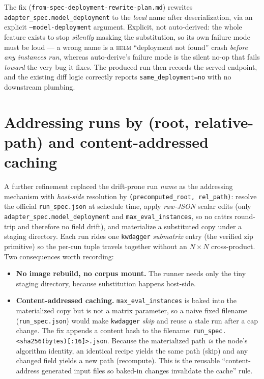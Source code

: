 \documentclass[11pt]{report}
\newcommand{\code}[1]{\texttt{#1}}
\newcommand{\file}[1]{\texttt{#1}}
\begin{document}
The fix (\file{from-spec-deployment-rewrite-plan.md}) rewrites
\code{adapter\_spec.model\_deployment} to the \emph{local} name after
deserialization, via an explicit \code{--model-deployment} argument. Explicit,
not auto-derived: the whole feature exists to stop \emph{silently} masking the
substitution, so its own failure mode must be loud --- a wrong name is a
\textsc{helm} ``deployment not found'' crash \emph{before any instances run},
whereas auto-derive's failure mode is the silent no-op that fails \emph{toward} the
very bug it fixes. The produced run then records the served endpoint, and the
existing diff logic correctly reports \code{same\_deployment=no} with no downstream
plumbing.

\section{Addressing runs by (root, relative-path) and content-addressed caching}

A further refinement replaced the drift-prone run \emph{name} as the addressing
mechanism with \emph{host-side} resolution by \code{(precomputed\_root,
rel\_path)}: resolve the official \file{run\_spec.json} at schedule time, apply
\emph{raw-JSON} scalar edits (only \code{adapter\_spec.model\_deployment} and
\code{max\_eval\_instances}, so no cattrs round-trip and therefore no field drift),
and materialize a substituted copy under a staging directory. Each run rides one
\code{kwdagger} \emph{submatrix} entry (the verified zip primitive) so the per-run
tuple travels together without an $N\times N$ cross-product. Two consequences worth
recording:

\begin{itemize}[nosep]
  \item \textbf{No image rebuild, no corpus mount.} The runner needs only the tiny
        staging directory, because substitution happens host-side.
  \item \textbf{Content-addressed caching.} \code{max\_eval\_instances} is baked
        into the materialized copy but is not a matrix parameter, so a naive fixed
        filename (\code{run\_spec.json}) would make \code{kwdagger} \emph{skip} and
        reuse a stale run after a cap change. The fix appends a content hash to the
        filename: \code{run\_spec.<sha256(bytes)[:16]>.json}. Because the
        materialized path \emph{is} the node's algorithm identity, an identical
        recipe yields the same path (skip) and any changed field yields a new path
        (recompute). This is the reusable ``content-address generated input files
        so baked-in changes invalidate the cache'' rule.
\end{itemize}
\end{document}
